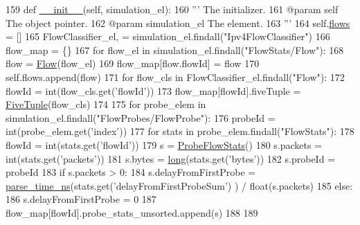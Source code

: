 \begin{DoxyCode}
159     \textcolor{keyword}{def }\hyperlink{classflowmon-parse-results_1_1Simulation_a3ad9056ca72eaed413fcfd6950541a3c}{\_\_init\_\_}(self, simulation\_el):
160         \textcolor{stringliteral}{''' The initializer.}
161 \textcolor{stringliteral}{        @param self The object pointer.}
162 \textcolor{stringliteral}{        @param simulation\_el The element.}
163 \textcolor{stringliteral}{        '''}
164         self.\hyperlink{classflowmon-parse-results_1_1Simulation_a284732729c5e18035724c5565ebd75b7}{flows} = []
165         FlowClassifier\_el, = simulation\_el.findall(\textcolor{stringliteral}{"Ipv4FlowClassifier"})
166         flow\_map = \{\}
167         \textcolor{keywordflow}{for} flow\_el \textcolor{keywordflow}{in} simulation\_el.findall(\textcolor{stringliteral}{"FlowStats/Flow"}):
168             flow = \hyperlink{classflowmon-parse-results_1_1Flow}{Flow}(flow\_el)
169             flow\_map[flow.flowId] = flow
170             self.flows.append(flow)
171         \textcolor{keywordflow}{for} flow\_cls \textcolor{keywordflow}{in} FlowClassifier\_el.findall(\textcolor{stringliteral}{"Flow"}):
172             flowId = int(flow\_cls.get(\textcolor{stringliteral}{'flowId'}))
173             flow\_map[flowId].fiveTuple = \hyperlink{classflowmon-parse-results_1_1FiveTuple}{FiveTuple}(flow\_cls)
174 
175         \textcolor{keywordflow}{for} probe\_elem \textcolor{keywordflow}{in} simulation\_el.findall(\textcolor{stringliteral}{"FlowProbes/FlowProbe"}):
176             probeId = int(probe\_elem.get(\textcolor{stringliteral}{'index'}))
177             \textcolor{keywordflow}{for} stats \textcolor{keywordflow}{in} probe\_elem.findall(\textcolor{stringliteral}{"FlowStats"}):
178                 flowId = int(stats.get(\textcolor{stringliteral}{'flowId'}))
179                 s = \hyperlink{classflowmon-parse-results_1_1ProbeFlowStats}{ProbeFlowStats}()
180                 s.packets = int(stats.get(\textcolor{stringliteral}{'packets'}))
181                 s.bytes = \hyperlink{generate__test__data__lte__sinr_8m_a0eab6be67e93c3411f7a8b53cc297285}{long}(stats.get(\textcolor{stringliteral}{'bytes'}))
182                 s.probeId = probeId
183                 \textcolor{keywordflow}{if} s.packets > 0:
184                     s.delayFromFirstProbe =  \hyperlink{namespaceflowmon-parse-results_a5612b6aed0ce819ee4f6fd3dbe251622}{parse\_time\_ns}(stats.get(\textcolor{stringliteral}{'delayFromFirstProbeSum'})
      ) / float(s.packets)
185                 \textcolor{keywordflow}{else}:
186                     s.delayFromFirstProbe = 0
187                 flow\_map[flowId].probe\_stats\_unsorted.append(s)
188 
189 
\end{DoxyCode}


